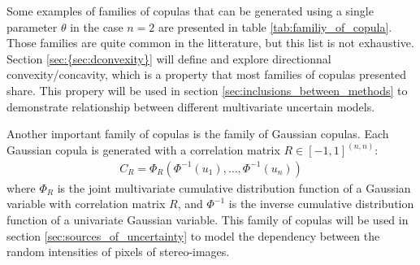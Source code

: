 Some examples of families of copulas that can be generated using a single parameter $\theta$ in the case $n=2$ are presented in table \ref{tab:familiy_of_copula}. Those families are quite common in the litterature, but this list is not exhaustive. Section \ref{sec:{sec:dconvexity}} will define and explore directionnal convexity/concavity, which is a property that most families of copulas presented share. This propery will be used in section \ref{sec:inclusions_between_methods} to demonstrate relationship between different multivariate uncertain models.

Another important family of copulas is the family of Gaussian copulas. Each Gaussian copula is generated with a correlation matrix $R\in[-1,1]^{(n,n)}$:
\begin{align}
    C_R=\Phi_R(\Phi^{-1}(u_1), \dots, \Phi^{-1}(u_n)) \label{eq:gaussian_copula}
\end{align} where $\Phi_R$ is the joint multivariate cumulative distribution function of a Gaussian variable with correlation matrix $R$, and $\Phi^{-1}$ is the inverse cumulative distribution function of a univariate Gaussian variable. This family of copulas will be used in section \ref{sec:sources_of_uncertainty} to model the dependency between the random intensities of pixels of stereo-images.

